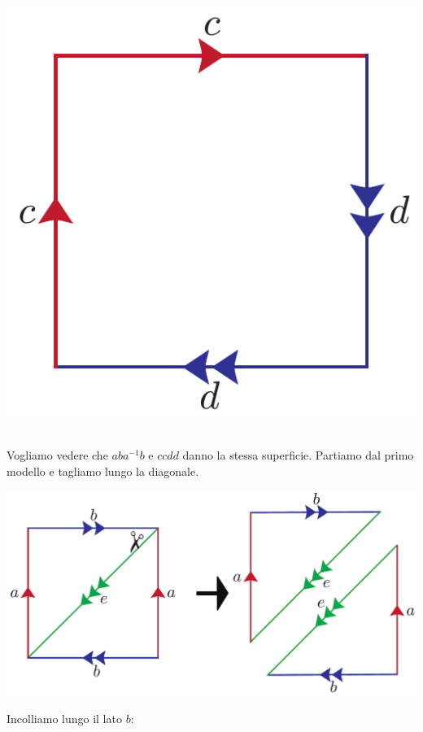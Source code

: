 \begin{observe}
\begin{minipage}{.24\linewidth}
\begin{center}
		\includegraphics[trim=0cm 0cm 0cm 0cm, clip, scale=0.3]{images/projdouble.pdf}
	\end{center}
\end{minipage}\\
Vogliamo vedere che $aba^{-1}b$ e $ccdd$ danno la stessa superficie. Partiamo dal primo modello e tagliamo lungo la diagonale.
\begin{center}
	\includegraphics[trim=0cm 0cm 0cm 0cm, clip, scale=0.3]{images/kleintoprojdouble1.pdf}
\end{center}
Incolliamo lungo il lato $b$:
\begin{center}

\end{center}
\end{observe}
